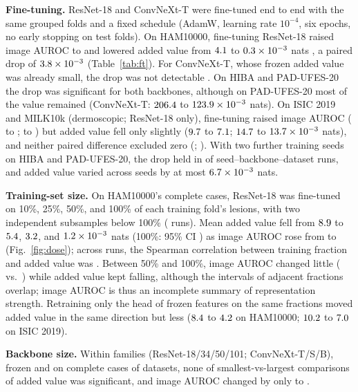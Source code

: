\documentclass[conference]{IEEEtran}
\begin{document}
\textbf{Fine-tuning.} ResNet-18 and ConvNeXt-T were fine-tuned end to end with the same grouped folds and a fixed schedule (AdamW, learning rate $10^{-4}$, six epochs, no early stopping on test folds). On HAM10000, fine-tuning ResNet-18 raised image AUROC to \FThamAUC{} and lowered added value from $4.1$ to $0.3\times10^{-3}$ nats \FThamCI{}, a paired drop of $3.8\times10^{-3}$ \FThamDiffCI{} (Table~\ref{tab:ft}). For ConvNeXt-T, whose frozen added value was already small, the drop was not detectable \FTcnxDiffCI{}. On HIBA and PAD-UFES-20 the drop was significant for both backbones, although on PAD-UFES-20 most of the value remained (ConvNeXt-T: $206.4$ to $123.9\times10^{-3}$ nats). On ISIC 2019 and MILK10k (dermoscopic; ResNet-18 only), fine-tuning raised image AUROC (\FTIsicAUCfrz{} to \FTIsicAUCft{}; \FTMilkAUCfrz{} to \FTMilkAUCft{}) but added value fell only slightly ($9.7$ to $7.1$; $14.7$ to $13.7\times10^{-3}$ nats), and neither paired difference excluded zero (\FTIsicDiffCI{}; \FTMilkDiffCI{}). With two further training seeds on HIBA and PAD-UFES-20, the drop held in \SEEDheld{} of \SEEDn{} seed--backbone--dataset runs, and added value varied across seeds by at most $6.7\times10^{-3}$ nats.

\textbf{Training-set size.} On HAM10000's complete cases, ResNet-18 was fine-tuned on 10\%, 25\%, 50\%, and 100\% of each training fold's lesions, with two independent subsamples below 100\% (\FTfracNruns{} runs). Mean added value fell from $8.9$ to $5.4$, $3.2$, and $1.2\times10^{-3}$ nats (100\%: 95\% CI \FTfracFullCI{}) as image AUROC rose from \FTfracTenAUC{} to \FTfracFullAUC{} (Fig.~\ref{fig:dose}); across runs, the Spearman correlation between training fraction and added value was \FTfracSpearman{}. Between 50\% and 100\%, image AUROC changed little (\FTfracFiftyAUC{} vs.\ \FTfracFullAUC{}) while added value kept falling, although the intervals of adjacent fractions overlap; image AUROC is thus an incomplete summary of representation strength. Retraining only the head of frozen features on the same fractions moved added value in the same direction but less ($8.4$ to $4.2$ on HAM10000; $10.2$ to $7.0$ on ISIC 2019).

\textbf{Backbone size.} Within families (ResNet-18/34/50/101; ConvNeXt-T/S/B), frozen and on complete cases of \SIZEdatasets{} datasets, none of \SIZEn{} smallest-vs-largest comparisons of added value was significant, and image AUROC changed by only \SIZEaucChangeMin{} to \SIZEaucChangeMax{}.
\end{document}
